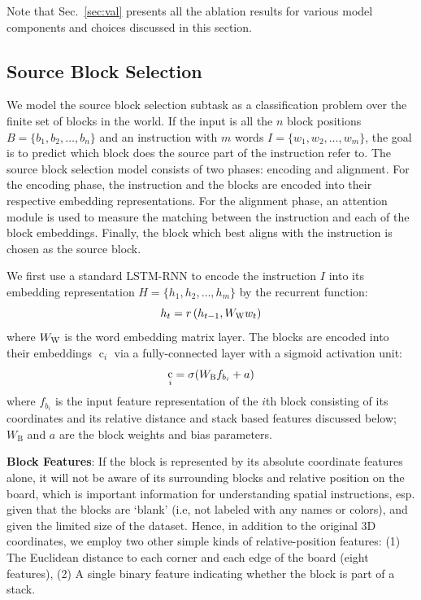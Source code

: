\documentclass[letterpaper]{article} %
\DeclareMathOperator{\embb}{c}
\begin{document}
Note that Sec.~\ref{sec:val} presents all the ablation results for various model components and choices discussed in this section.

\subsection{Source Block Selection} \label{source}
We model the source block selection subtask as a classification problem over the finite set of blocks in the world.
If the input is all the $n$ block positions $B = \{b_1, b_2, \ldots, b_n\}$ and an instruction with $m$ words $I=\{w_1, w_2, \ldots, w_m\}$, the goal is to predict which block does the source part of the instruction refer to.
The source block selection model consists of two phases: encoding and alignment. For the encoding phase, the instruction and the blocks are encoded into their respective embedding representations. For the alignment phase, an attention module is used to measure the matching between the instruction and each of the block embeddings. Finally, the block which best aligns with the instruction is chosen as the source block.

We first use a standard LSTM-RNN to encode the instruction $I$ into its embedding representation $H = \{h_1, h_2, \ldots, h_m\}$ by the recurrent function:
\begin{equation}
h_t = r\left( h_{t-1}, W_{\textsc{W}} w_t \right)
\end{equation}
where $W_{\textsc{W}}$ is the word embedding matrix layer.
The blocks are encoded into their embeddings $\embb_i$ via a fully-connected layer with a sigmoid activation unit:
\begin{equation}
\embb_i = \sigma(W_\textsc{B} f_{b_i} + a)
\end{equation}
where $f_{b_i}$ is the input feature representation of the $i$th block consisting of its coordinates and its relative distance and stack based features discussed below; $W_\text{B}$ and $a$ are the block weights and bias parameters.

\textbf{Block Features}:
If the block is represented by its absolute coordinate features alone, it will not be aware of its surrounding blocks and relative position on the board, which is important information for understanding spatial instructions, esp. given that the blocks are `blank' (i.e, not labeled with any names or colors), and given the limited size of the dataset. Hence, in addition to the original 3D coordinates, we employ two other simple kinds of relative-position features: (1) The Euclidean distance to each corner and each edge of the board (eight features), (2) A single binary feature indicating whether the block is part of a stack.
\end{document}
